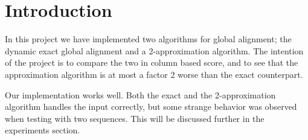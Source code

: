 \section{Introduction}
In this project we have implemented two algorithms for global alignment; the dynamic exact global alignment and a 2-approximation algorithm. The intention of the project is to compare the two in column based score, and to see that the approximation algorithm is at most a factor 2 worse than the exact counterpart. 

Our implementation works well. Both the exact and the 2-approximation algorithm handles the input correctly, but some strange behavior was observed when testing with two sequences. This will be discussed further in the experiments section. 
